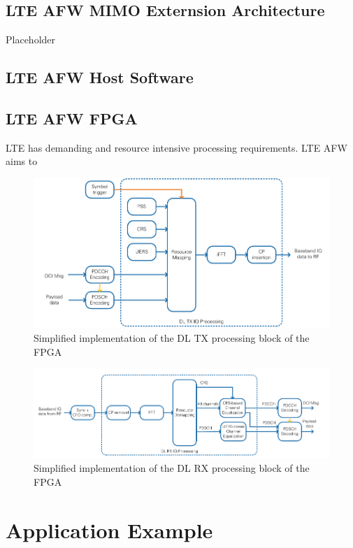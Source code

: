 \subsection{LTE AFW MIMO Externsion Architecture}\label{ssec:LTEAFWArch}
Placeholder

\subsection{LTE AFW Host Software}\label{ssec:LTEAFWHostSW}

\subsection{LTE AFW FPGA}\label{ssec:LTEAFWFPGA}
LTE has demanding and resource intensive processing requirements. LTE AFW aims to 

\begin{figure}[H]
\centering
\includegraphics[width=\linewidth]{images/DLFPGATXImpl.png}
\caption{Simplified implementation of the DL TX processing block of the FPGA}
\label{fig:LTEAFWFPGADLTXProc}
\end{figure}

\begin{figure}[H]
\centering
\includegraphics[width=\linewidth]{images/DLFPGARXImpl.png}
\caption{Simplified implementation of the DL RX processing block of the FPGA}
\label{fig:LTEAFWFPGADLTXProc}
\end{figure}

\section{Application Example}\label{sec:AppEx}

